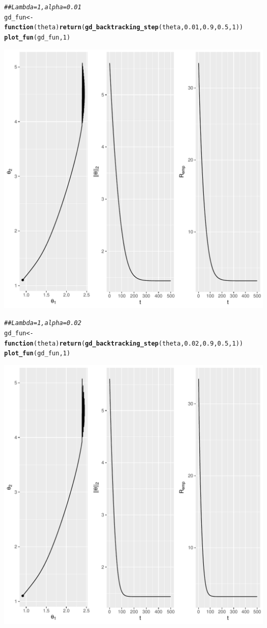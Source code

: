\documentclass[a4paper]{article}
\makeatletter
\newcommand{\hlnum}[1]{\textcolor[rgb]{0.686,0.059,0.569}{#1}}%
\newcommand{\hlcom}[1]{\textcolor[rgb]{0.678,0.584,0.686}{\textit{#1}}}%
\newcommand{\hlstd}[1]{\textcolor[rgb]{0.345,0.345,0.345}{#1}}%
\newcommand{\hlkwa}[1]{\textcolor[rgb]{0.161,0.373,0.58}{\textbf{#1}}}%
\newcommand{\hlkwb}[1]{\textcolor[rgb]{0.69,0.353,0.396}{#1}}%
\newcommand{\hlkwc}[1]{\textcolor[rgb]{0.333,0.667,0.333}{#1}}%
\newcommand{\hlkwd}[1]{\textcolor[rgb]{0.737,0.353,0.396}{\textbf{#1}}}%
\newenvironment{kframe}{%
 \def\at@end@of@kframe{}%
 \ifinner\ifhmode%
  \def\at@end@of@kframe{\end{minipage}}%
  \begin{minipage}{\columnwidth}%
 \fi\fi%
 \def\FrameCommand##1{\hskip\@totalleftmargin \hskip-\fboxsep
 \colorbox{shadecolor}{##1}\hskip-\fboxsep
     \hskip-\linewidth \hskip-\@totalleftmargin \hskip\columnwidth}%
 \MakeFramed {\advance\hsize-\width
   \@totalleftmargin\z@ \linewidth\hsize
   \@setminipage}}%
 {\par\unskip\endMakeFramed%
 \at@end@of@kframe}
\newenvironment{knitrout}{}{} %
\makeatother
\begin{document}
{\begin{enumerate}
\begin{knitrout}
\begin{kframe}
\begin{alltt}
\hlcom{## Lambda = 1, alpha = 0.01}
\hlstd{gd_fun} \hlkwb{<-} \hlkwa{function}\hlstd{(}\hlkwc{theta}\hlstd{)} \hlkwd{return}\hlstd{(}\hlkwd{gd_backtracking_step}\hlstd{(theta,} \hlnum{0.01}\hlstd{,} \hlnum{0.9}\hlstd{,} \hlnum{0.5}\hlstd{,} \hlnum{1}\hlstd{))}
\hlkwd{plot_fun}\hlstd{(gd_fun,} \hlnum{1}\hlstd{)}
\end{alltt}
\end{kframe}
\includegraphics[width=0.5\linewidth]{figure/mv-plot_gd_backtrack-1} 
\begin{kframe}\begin{alltt}
\hlcom{## Lambda = 1, alpha = 0.02}
\hlstd{gd_fun} \hlkwb{<-} \hlkwa{function}\hlstd{(}\hlkwc{theta}\hlstd{)} \hlkwd{return}\hlstd{(}\hlkwd{gd_backtracking_step}\hlstd{(theta,} \hlnum{0.02}\hlstd{,} \hlnum{0.9}\hlstd{,} \hlnum{0.5}\hlstd{,} \hlnum{1}\hlstd{))}
\hlkwd{plot_fun}\hlstd{(gd_fun,} \hlnum{1}\hlstd{)}
\end{alltt}
\end{kframe}
\includegraphics[width=0.5\linewidth]{figure/mv-plot_gd_backtrack-2} 
\end{knitrout}
\end{enumerate}
}
\end{document}
